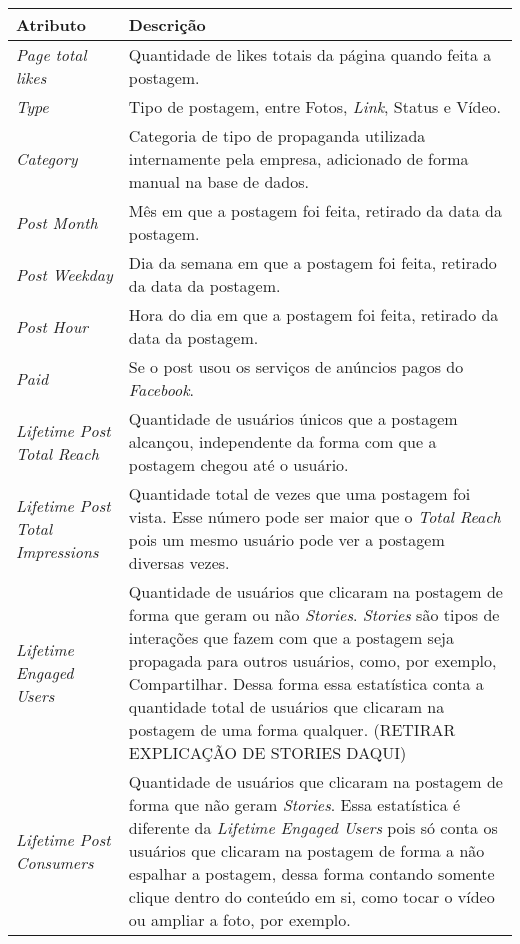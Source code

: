 

\begin{quadro}[!htb]
	\centering
	\caption{Descrição dos atributos da base de dados utilizada no trabalho.\label{qua:descBaseDados}}
	\small
	\begin{longtable}{|p{7cm}|p{7cm}|}
        		\hline
		\textbf{Atributo} & \textbf{Descrição} \\ \hline
		\textit{Page total likes} & Quantidade de likes totais da página quando feita a postagem. \\ \hline
		\textit{Type} & Tipo de postagem, entre Fotos, \textit{Link}, Status e Vídeo. \\ \hline
		\textit{Category} & Categoria de tipo de propaganda utilizada internamente pela empresa, adicionado de forma manual na base de dados. \\ \hline
		\textit{Post Month} & Mês em que a postagem foi feita, retirado da data da postagem. \\ \hline
		\textit{Post Weekday} & Dia da semana em que a postagem foi feita, retirado da data da postagem. \\ \hline
		\textit{Post Hour} & Hora do dia em que a postagem foi feita, retirado da data da postagem. \\ \hline
		\textit{Paid} & Se o post usou os serviços de anúncios pagos do \textit{Facebook}. \\ \hline
		\textit{Lifetime Post Total Reach} & Quantidade de usuários únicos que a postagem alcançou, independente da forma com que a postagem chegou até o usuário. \\ \hline
		\textit{Lifetime Post Total Impressions} & Quantidade total de vezes que uma postagem foi vista. Esse número pode ser maior que o \textit{Total Reach} pois um mesmo usuário pode ver a postagem diversas vezes. \\ \hline
		\textit{Lifetime Engaged Users} & Quantidade de usuários que clicaram na postagem de forma que geram ou não \textit{Stories}. \textit{Stories} são tipos de interações que fazem com que a postagem seja propagada para outros usuários, como, por exemplo, Compartilhar. Dessa forma essa estatística conta a quantidade total de usuários que clicaram na postagem de uma forma qualquer. (RETIRAR EXPLICAÇÃO DE STORIES DAQUI) \\ \hline
		\textit{Lifetime Post Consumers} & Quantidade de usuários que clicaram na postagem de forma que não geram \textit{Stories}. Essa estatística é diferente da \textit{Lifetime Engaged Users} pois só conta os usuários que clicaram na postagem de forma a não espalhar a postagem, dessa forma contando somente clique dentro do conteúdo em si, como tocar o vídeo ou ampliar a foto, por exemplo. \\ \hline

\end{longtable}
\end{quadro}
